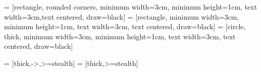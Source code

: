 \usepackage{listings}

\usepackage{csquotes} %






\usepackage{setspace} %

\usepackage{indentfirst} 	%
\usepackage{graphicx}		%
\usepackage{float}			%
\usepackage{setspace}   	%
\usepackage{textcomp}   	%
\usepackage{url}       		%
\usepackage{hyperref}		%
\usepackage[all]{hypcap}	%
\hypersetup{colorlinks,     %
			breaklinks,  
			linkcolor=darkblue,
			urlcolor=darkblue,
			anchorcolor=darkblue,
			citecolor=darkblue}
\usepackage[perpage,para,symbol]{footmisc} %
\usepackage{tikz,fp,ifthen}
\usepackage{pgfmath}
\usetikzlibrary{backgrounds}
\usetikzlibrary{decorations.pathmorphing,backgrounds,fit,calc,through}
\usetikzlibrary{arrows}
\usetikzlibrary{decorations,shadows}
\usetikzlibrary{fadings}
\usetikzlibrary{patterns}
\usetikzlibrary{mindmap}
\usetikzlibrary{decorations.text}
\usetikzlibrary{decorations.shapes}

\usetikzlibrary{shapes.geometric, arrows}
\usetikzlibrary{arrows.meta, positioning}
\usetikzlibrary{arrows}

 = [rectangle, rounded corners, minimum width=3cm, minimum height=1cm, text width=3cm,text centered, draw=black] %
 = [rectangle, minimum width=3cm, minimum height=1cm, text width=3cm, text centered, draw=black] %
 = [circle, thick, minimum width=3cm, minimum height=1cm, text width=3cm, text centered, draw=black] %

 = [thick,->,>=stealth]
 = [thick,>=stealth]


